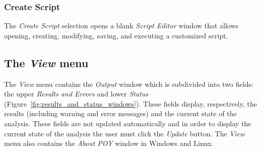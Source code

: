 \subsubsection{Create Script}
The \emph{Create Script} selection opens a blank \emph{Script Editor} window that allows opening, creating, modifying, saving, and executing  a customized script.

\subsection{The \emph{View} menu}

The \emph{View} menu contains the \emph{Output} window which is subdivided into two fields: the upper \emph{Results and Errors} and lower \emph{Status} (Figure~\ref{fig:results_and_status_windows}). These fields display, respectively, the results (including warning and error messages) and the current state of the analysis. These fields are not updated automatically and in order to display the current state of the analysis the user must click the \emph{Update} button. The \emph{View} menu also contains the \emph{About POY} window in Windows and Linux.

